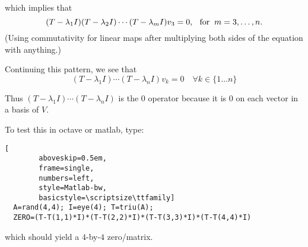 \begin{prf}
  which implies that
  \begin{equation}
    (T-\lambda_1 I) (T-\lambda_2 I) \cdots (T-\lambda_m I) v_3= 0, \;\;\, \text{for}\;\; m = 3, \ldots, n.
  \end{equation}
  (Using commutativity for linear maps after multiplying both sides of the equation with anything.)
  \bigbreak

  Continuing this pattern, we see that
  \begin{equation}
    (T-\lambda_1 I) \cdots (T- \lambda_n I) v_k = 0 \quad \forall k \in \{ 1\ldots n \}
  \end{equation}

  Thus $(T-\lambda_1 I) \cdots (T- \lambda_n I)$ is the $0$ operator because it is $0$ on each vector in a basis of $V$.
\end{prf}

\begin{example-non}
  To test this  in octave or matlab, type:

  \begin{center}
    \begin{minipage}{\linewidth}
      \addtolength{\linewidth}{-7em}
      \begin{lstlisting}[
        aboveskip=0.5em,
        frame=single,
        numbers=left,
        style=Matlab-bw,
        basicstyle=\scriptsize\ttfamily]
  A=rand(4,4); I=eye(4); T=triu(A);
  ZERO=(T-T(1,1)*I)*(T-T(2,2)*I)*(T-T(3,3)*I)*(T-T(4,4)*I)
      \end{lstlisting}
      \addtolength{\linewidth}{+7em}
    \end{minipage}
  \end{center}

  which should yield a $4$-by-$4$ zero\-/matrix.
\end{example-non}


